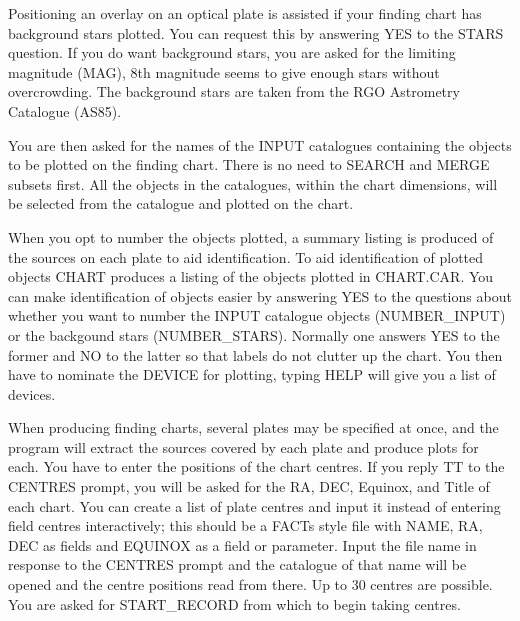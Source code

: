 Positioning an overlay on an optical plate is assisted if your
finding chart has background stars plotted.
You can request this by answering YES to the STARS question.
If you do want background stars, you are asked for the limiting magnitude
(MAG), 8th magnitude seems to give enough stars without overcrowding.
The background stars are taken from the RGO Astrometry Catalogue (AS85).

You are then asked for the names of the INPUT catalogues containing
the objects to be plotted on the finding chart.
There is no need to SEARCH and MERGE subsets first.
All the objects in the catalogues, within the chart dimensions, will be
selected from the catalogue and plotted on the chart.

When you opt to number the objects plotted, a summary listing is produced
of the sources on each plate to aid identification.
To aid identification of plotted objects CHART produces
a listing of the objects plotted in CHART.CAR.
You can make identification of objects easier by answering YES to the
questions about whether you want to number the INPUT catalogue
objects (NUMBER\_INPUT) or the backgound stars (NUMBER\_STARS).
Normally one answers YES to the former and NO to the latter
so that labels do not clutter up the chart.
You then have to nominate the DEVICE for plotting, typing HELP
will give you a list of devices.

When producing finding charts, several plates may be specified at once, and the
program will extract the sources covered by each plate and produce plots for
each.
You have to enter the positions of the chart centres.
If you reply TT to the CENTRES prompt, you will be asked for the
RA, DEC, Equinox, and Title of each chart.
You can create a list of plate centres and input it instead of entering field
centres interactively; this should be a FACTs style file with NAME, RA, DEC as
fields and EQUINOX as a field or parameter.
Input the file name in response to the CENTRES prompt and
the catalogue of that name will be opened and the centre positions
read from there.
Up to 30 centres are possible.
You are asked for START\_RECORD from which to begin taking centres.

